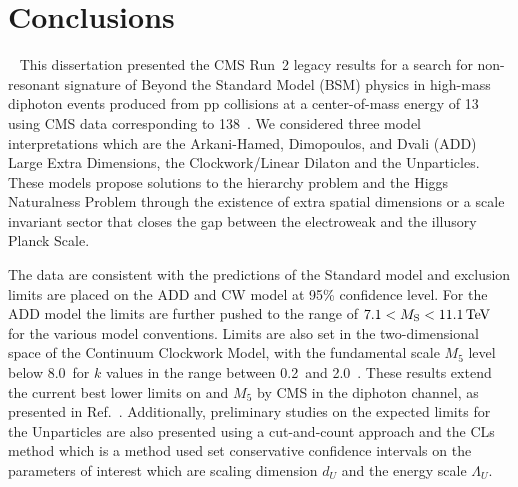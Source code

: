 \chapter{\textnormal{Conclusions}}~\label{ch:conclusion}
This dissertation presented the CMS Run~2 legacy results for a search for non-resonant signature of Beyond the Standard Model (BSM) physics in high-mass diphoton events produced from pp collisions at a center-of-mass energy of 13 \TeV using CMS data corresponding to 138~\fbinv. We considered three model interpretations which are the Arkani-Hamed, Dimopoulos, and Dvali (ADD) Large Extra Dimensions, the Clockwork/Linear Dilaton and the Unparticles. These models propose solutions to the hierarchy problem and the Higgs Naturalness Problem through the existence of extra spatial dimensions or a scale invariant sector that closes the gap between the electroweak and the illusory Planck Scale.

The data are consistent with the predictions of the Standard model and exclusion limits are placed on the ADD and CW model at 95\% confidence level. For the ADD model the limits are further pushed to the range of $7.1 < M_{\rm S} < 11.1\,\text{Te\hspace{-.08em}V}$ for the various model conventions. Limits are also set in the two-dimensional space of the Continuum Clockwork Model, with the fundamental scale $M_5$ level below 8.0~\TeV for $k$ values in the range between 0.2~\GeV and 2.0~\TeV. These results extend the current best lower limits on \Ms and $M_5$ by CMS in the diphoton channel, as presented in Ref.~\cite{cmsdiphoton2016}. Additionally, preliminary studies on the expected limits for the Unparticles are also presented using a cut-and-count approach and the CLs method which is a method used set conservative confidence intervals on the parameters of interest which are scaling dimension $d_U$ and the energy scale $\Lambda_{U}$. 


